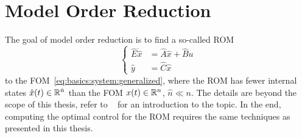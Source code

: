 \section{Model Order Reduction}

The goal of model order reduction is to find a so-called \ac{ROM}
\begin{equation}
\left\{
\begin{aligned}
  \hat E \dot{\hat x} &= \hat A \hat x + \hat B u \\
  \hat y &= \hat C \hat x
\end{aligned}
\right.
\end{equation}
to the \ac{FOM}~\eqref{eq:basics:system:generalized},
where the \ac{ROM} has fewer internal states $\hat x(t) \in\mathbb{R}^{\hat n}$
than the \ac{FOM} $x(t) \in\mathbb{R}^n$, $\hat n \ll n$.
The details are beyond the scope of this thesis,
refer to \eg~\cite{Antoulas2005,BennerMehrmannSorensen2005,Benner2021} for an introduction to the topic.
In the end, computing the optimal control for the \ac{ROM} requires the same techniques as presented in this thesis.
